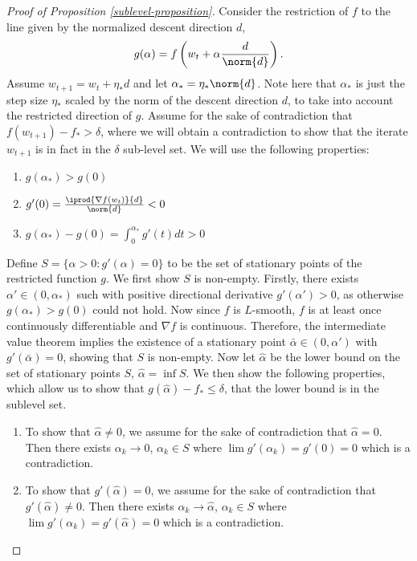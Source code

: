 \documentclass[10pt]{article} %
\newcommand{\wk}{w_t}
\newcommand{\wkk}{w_{t+1}}
\begin{document}
\iffalse
\begin{proof}[Proof of Proposition \ref{sublevel-proposition}]
    
    

    Consider the restriction of $f$ to the line given by the normalized descent direction $d$,
    \[
        g(\alpha) = f\left(w_{t} + \alpha \frac{d}{\norm{d}}\right).
    \]
    Assume $\wkk = \wk + \eta_* d$ and
    let $\alpha_{*} = \eta_{*}\norm{d}$. Note here that $\alpha_{*}$ is just the step size $\eta_{*}$ scaled by the norm of the descent direction $d$, to take into account the restricted direction of $g$. Assume for the sake of contradiction that $f(w_{t+1}) - f_* > \delta$, where we will obtain a contradiction to show that the iterate $w_{t+1}$ is in fact in the $\delta$ sub-level set. We will use the following properties:
    \begin{enumerate}
        \item $g(\alpha_{*}) > g(0)$
        \item $g'(0) =\frac{\iprod{\nabla f(w_{t})}{d}}{\norm{d}} < 0$
        \item $g(\alpha_{*}) - g(0) = \int_0^{\alpha_{*}}g'(t)dt > 0$
    \end{enumerate}
    Define $S = \{\alpha > 0 : g'(\alpha) = 0 \}$ to be the set of stationary points of the restricted function $g$. We first show $S$ is non-empty. Firstly,
    there exists $\alpha' \in (0, \alpha_{*})$ such with positive directional derivative $g'(\alpha') > 0$,
    as otherwise $g(\alpha_*) > g(0)$ could not hold.
    Now since $f$ is $L$-smooth, $f$ is at least once continuously differentiable and $\nabla f$ is continuous. Therefore, the intermediate value theorem implies the existence of a stationary point $\bar{\alpha} \in (0, \alpha')$ with $g'(\bar{\alpha}) = 0$, showing that $S$ is non-empty. Now let $\hat{\alpha}$ be the lower bound on the set of stationary points $S$, $\hat{\alpha} = \inf S$. We then show the following properties, which allow us to show that $g(\hat{\alpha}) - f_{*} \leq \delta$, that the lower bound is in the sublevel set.
    \begin{enumerate}
        \item To show that $\hat{\alpha} \neq 0$, we assume for the sake of contradiction that $\hat{\alpha} = 0$. Then there exists $\alpha_{k} \rightarrow 0$, $\alpha_{k} \in S$ where $\lim g'(\alpha_{k}) = g'(0) = 0$ which is a contradiction.
        \item To show that $g'(\hat{\alpha}) = 0$, we assume for the sake of contradiction that $g'(\hat{\alpha}) \neq 0$. Then there exists $\alpha_{k} \rightarrow \hat{\alpha}$, $\alpha_{k} \in S$ where $\lim g'(\alpha_{k}) = g'(\hat{\alpha}) = 0$ which is a contradiction.

\end{enumerate}
\end{proof}
\end{document}
